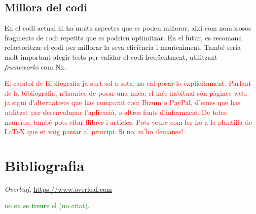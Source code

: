 \documentclass[a4paper,12pt,twoside]{ThesisStyle}
\newcommand{\pau}[1]{\textcolor{red}{#1}}
\newcommand{\sudan}[1]{\textcolor{green}{#1}}
\begin{document}
\section{Millora del codi}
\label{sec: Millora del codi}


En el codi actual hi ha molts aspectes que es poden millorar, així com nombrosos fragments de codi repetits que es podrien optimitzar. En el futur, es recomana refactoritzar el codi per millorar la seva eficiència i manteniment. També seria molt important afegir tests per validar el codi freqüentment, utilitzant \textit{frameworks} com Nx.




\pau{El capítol de Bibliografia ja surt sol a sota, no cal posar-lo explícitament. Parlant de la bibliografia, n'hauries de posar una mica: el més habitual són pàgines web, ja sigui d'alternatives que has comparat com Bizum o PayPal, d'eines que has utilitzat per desenvolupar l'aplicació, o altres fonts d'informació. De totes maneres, també pots citar llibres i articles. Pots veure com fer-ho a la plantilla de LaTeX que et vaig passar al principi. Si no, m'ho demanes!}





\chapter{Bibliografia}
\renewcommand{\bibsection}{} %




\begin{thebibliography}{9}

    \textit{Overleaf},
    \url{https://www.overleaf.com}

    
\end{thebibliography}
\sudan{no en se treure el (no citat).}







\end{document}
